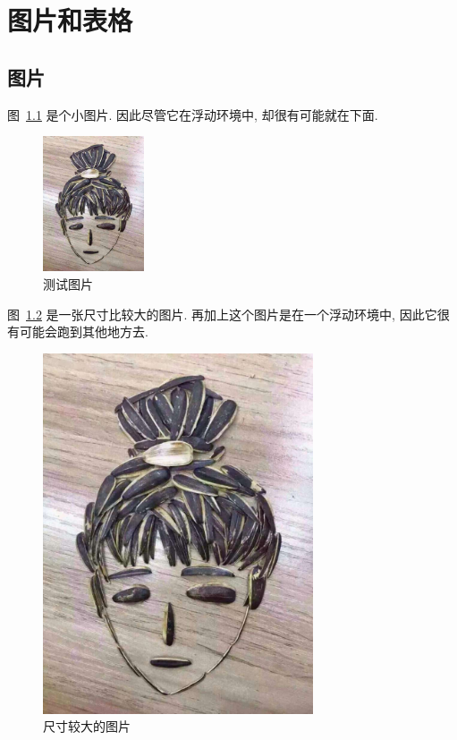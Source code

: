 \chapter{图片和表格}

\section{图片}

图~\ref{fig:test} 是个小图片. 因此尽管它在浮动环境中, 却很有可能就在下面.

\begin{figure}[!htb]
\centering
\includegraphics[height=4cm]{figure/test}
\caption{测试图片}
\label{fig:test}
\end{figure}

图~\ref{fig:bigfigure} 是一张尺寸比较大的图片. 再加上这个图片是在一个浮动环境中, 因此它很有可能会跑到其他地方去.

\begin{figure}[!htb]
\centering
\includegraphics[width=8cm]{figure/test}
\caption{尺寸较大的图片}
\label{fig:bigfigure}
\end{figure}

